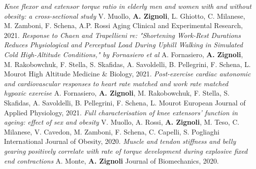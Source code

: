 \documentclass[helvetica,openbib,logo,notitle,flagCMYK,totpages]{europecv}
\begin{document}
\begin{europecv}
{    \newline
	\newline
	\emph{Knee flexor and extensor torque ratio in elderly men and women with and without obesity: a cross-sectional study}
	\newline 
	V. Muollo, \textbf{A. Zignoli}, L. Ghiotto, C. Milanese, M. Zamboni, F. Schena, A.P. Rossi
    \newline 
	Aging Clinical and Experimental Research, 2021. 
    \newline
	\newline
	\emph{Response to Chaen and Trapellieni re: "Shortening Work-Rest Durations Reduces Physiological and Perceptual Load During Uphill Walking in Simulated Cold High-Altitude Conditions," by Fornasiero et al}
	\newline 
	A. Fornasiero, \textbf{A. Zignoli}, M. Rakobowchuk, F. Stella, S. Skafidas, A. Savoldelli, B. Pellegrini, F. Schena, L. Mourot
    \newline 
	High Altitude Medicine \& Biology, 2021. 
    \newline
	\newline
	\emph{Post-exercise cardiac autonomic and cardiovascular responses to heart rate matched and work rate matched hypoxic exercise}
	\newline 
	A. Fornasiero, \textbf{A. Zignoli}, M. Rakobowchuk, F. Stella, S. Skafidas, A. Savoldelli, B. Pellegrini, F. Schena, L. Mourot
    \newline 
	European Journal of Applied Physiology, 2021. 
    \newline
	\newline
	\emph{Full characterisation of knee extensors’ function in ageing: effect of sex and obesity}
	\newline 
	V. Muollo, A. Rossi, \textbf{A. Zignoli}, M. Teso, C. Milanese, V. Cavedon, M. Zamboni, F. Schena, C. Capelli, S. Pogliaghi
    \newline 
	International Journal of Obesity, 2020. 
    \newline
	\newline
	\emph{Muscle and tendon stiffness and belly gearing positively correlate with rate of torque development during explosive fixed end contractions}
	\newline 
	A. Monte, \textbf{A. Zignoli}
    \newline 
	Journal of Biomechanics, 2020. 
    \newline
	\newline
}
\end{europecv}
\end{document}
